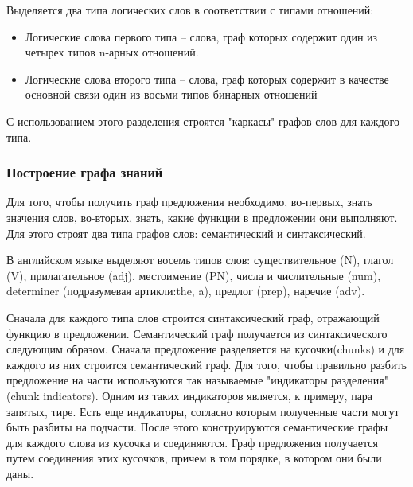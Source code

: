 Выделяется два типа логических слов в соответствии с типами отношений:
\begin{itemize}

\item{
Логические слова первого типа – слова, граф которых содержит один из четырех типов n-арных отношений.
}

\item{
Логические слова второго типа – слова, граф которых содержит в качестве основной связи один из восьми типов 
бинарных отношений
}
\end {itemize}

С использованием этого разделения строятся "каркасы" графов слов для каждого типа. 


\subsubsection {Построение графа знаний}
Для того, чтобы получить граф предложения необходимо, во-первых,  знать значения слов,
во-вторых, знать, какие функции в предложении они выполняют. Для этого строят два типа графов
слов: семантический и синтаксический.

В английском языке выделяют восемь типов слов: существительное (N), глагол (V), прилагательное (adj),
местоимение (PN),  числа и числительные (num), determiner (подразумевая артикли:the, a), предлог (prep),
наречие (adv).

Сначала для каждого типа слов строится синтаксический граф, отражающий функцию в предложении.
Семантический граф получается из синтаксического следующим образом. Сначала предложение
разделяется на кусочки(chunks) и для каждого из них строится семантический граф. Для того,
чтобы правильно разбить предложение на части используются так называемые "индикаторы разделения"
(chunk indicators). Одним из таких индикаторов является, к примеру, пара запятых, тире. Есть еще 
индикаторы, согласно которым полученные части могут быть разбиты на подчасти.
После этого конструируются семантические графы для каждого слова из кусочка и соединяются.
Граф предложения получается путем соединения этих кусочков, причем в том порядке, в котором
они были даны.





